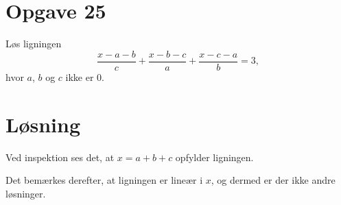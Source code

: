 \documentclass[12pt,oneside,a4paper]{article}
\begin{document}
\section{Opgave 25}
Løs ligningen
$$
\frac{x-a-b}{c} + \frac{x-b-c}{a} + \frac{x-c-a}{b} = 3,
$$
hvor $a$, $b$ og $c$ ikke er 0.

\section{Løsning}
Ved inspektion ses det, at $x=a+b+c$ opfylder ligningen.

Det bemærkes derefter, at ligningen er lineær i $x$, og dermed er der ikke andre løsninger.
\end{document}
